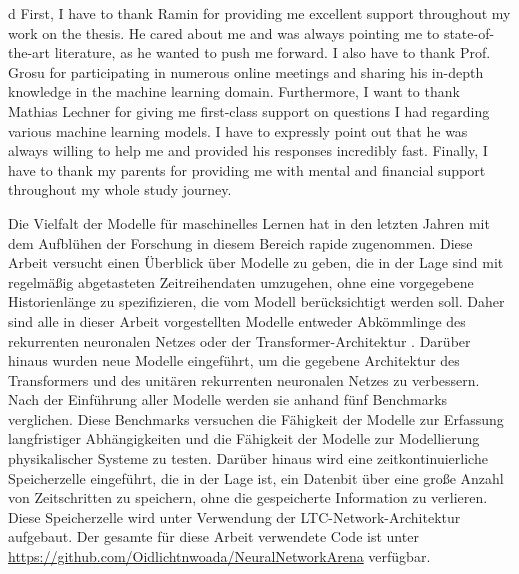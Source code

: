\documentclass[draft,final]{vutinfth} %
\begin{document}
    \frontmatter %


    \AddStatementPage


    \begin{acknowledgements*}
        d
        First, I have to thank Ramin for providing me excellent support throughout my work on the thesis.
        He cared about me and was always pointing me to state-of-the-art literature, as he wanted to push me forward.
        I also have to thank Prof. Grosu for participating in numerous online meetings and sharing his in-depth knowledge in the machine learning domain.
        Furthermore, I want to thank Mathias Lechner for giving me first-class support on questions I had regarding various machine learning models.
        I have to expressly point out that he was always willing to help me and provided his responses incredibly fast.
        Finally, I have to thank my parents for providing me with mental and financial support throughout my whole study journey.
    \end{acknowledgements*}

    \begin{kurzfassung}
        Die Vielfalt der Modelle für maschinelles Lernen hat in den letzten Jahren mit dem Aufblühen der Forschung in diesem Bereich rapide zugenommen.
        Diese Arbeit versucht einen Überblick über Modelle zu geben, die in der Lage sind mit regelmäßig abgetasteten Zeitreihendaten umzugehen, ohne eine vorgegebene Historienlänge zu spezifizieren, die vom Modell berücksichtigt werden soll.
        Daher sind alle in dieser Arbeit vorgestellten Modelle entweder Abkömmlinge des rekurrenten neuronalen Netzes oder der Transformer-Architektur \cite{Transformer}.
        Darüber hinaus wurden neue Modelle eingeführt, um die gegebene Architektur des Transformers \cite{Transformer} und des unitären rekurrenten neuronalen Netzes \cite{EfficientUnitaryRNNs} zu verbessern.
        Nach der Einführung aller Modelle werden sie anhand fünf Benchmarks verglichen.
        Diese Benchmarks versuchen die Fähigkeit der Modelle zur Erfassung langfristiger Abhängigkeiten und die Fähigkeit der Modelle zur Modellierung physikalischer Systeme zu testen.
        Darüber hinaus wird eine zeitkontinuierliche Speicherzelle eingeführt, die in der Lage ist, ein Datenbit über eine große Anzahl von Zeitschritten zu speichern, ohne die gespeicherte Information zu verlieren.
        Diese Speicherzelle wird unter Verwendung der LTC-Network-Architektur \cite{LTCNetworks} aufgebaut.
        Der gesamte für diese Arbeit verwendete Code ist unter \url{https://github.com/Oidlichtnwoada/NeuralNetworkArena} verfügbar.
    \end{kurzfassung}
\end{document}
